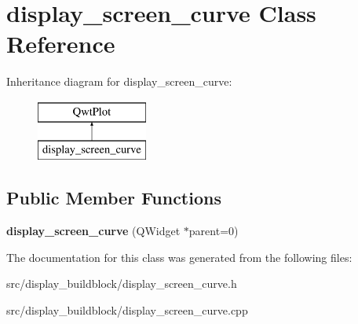 \hypertarget{classdisplay__screen__curve}{}\section{display\+\_\+screen\+\_\+curve Class Reference}
\label{classdisplay__screen__curve}
Inheritance diagram for display\+\_\+screen\+\_\+curve\+:\begin{figure}[H]
\begin{center}
\leavevmode
\includegraphics[height=2.000000cm]{classdisplay__screen__curve}
\end{center}
\end{figure}
\subsection*{Public Member Functions}
\begin{DoxyCompactItemize}
\item 
\mbox{\label{classdisplay__screen__curve_aabb76c64ffd5643c962e39d539a3ea2e}} 
{\bfseries display\+\_\+screen\+\_\+curve} (Q\+Widget $\ast$parent=0)
\end{DoxyCompactItemize}


The documentation for this class was generated from the following files\+:\begin{DoxyCompactItemize}
\item 
src/display\+\_\+buildblock/display\+\_\+screen\+\_\+curve.\+h\item 
src/display\+\_\+buildblock/display\+\_\+screen\+\_\+curve.\+cpp\end{DoxyCompactItemize}
